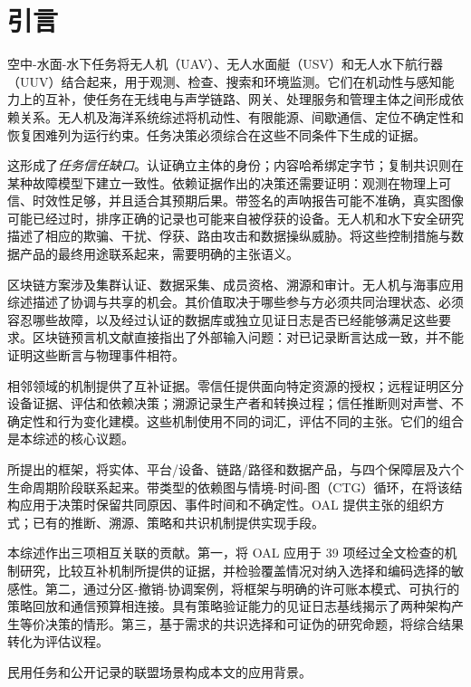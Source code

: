 \section{引言}

空中-水面-水下任务将无人机（UAV）、无人水面艇（USV）和无人水下航行器（UUV）结合起来，用于观测、检查、搜索和环境监测。它们在机动性与感知能力上的互补，使任务在无线电与声学链路、网关、处理服务和管理主体之间形成依赖关系\citep{li2023survey,wei20233u,pang2026cooperative}。无人机及海洋系统综述将机动性、有限能源、间歇通信、定位不确定性和恢复困难列为运行约束\citep{hayat2016survey,shakhatreh2019unmanned,bae2023survey,gonzlezgarca2020autonomous}。任务决策必须综合在这些不同条件下生成的证据。

这形成了\emph{任务信任缺口}。认证确立主体的身份；内容哈希绑定字节；复制共识则在某种故障模型下建立一致性。依赖证据作出的决策还需要证明：观测在物理上可信、时效性足够，并且适合其预期后果。带签名的声呐报告可能不准确，真实图像可能已经过时，排序正确的记录也可能来自被俘获的设备。无人机和水下安全研究描述了相应的欺骗、干扰、俘获、路由攻击和数据操纵威胁\citep{mekdad2023survey,wang2025survey,hadi2023comprehensive,jiang2019securing,yisa2021security}。将这些控制措施与数据产品的最终用途联系起来，需要明确的主张语义。

区块链方案涉及集群认证、数据采集、成员资格、溯源和审计\citep{han2022identity,tan2022blockchain,karmakar2024blockchain,islam2019bus}。无人机与海事应用综述描述了协调与共享的机会\citep{hafeez2023blockchain,alladi2020applications,mehta2020blockchain,farah2024survey,li2021survey}。其价值取决于哪些参与方必须共同治理状态、必须容忍哪些故障，以及经过认证的数据库或独立见证日志是否已经能够满足这些要求。区块链预言机文献直接指出了外部输入问题：对已记录断言达成一致，并不能证明这些断言与物理事件相符\citep{caldarelli2020oracle,albreiki2020oracles}。

相邻领域的机制提供了互补证据。零信任提供面向特定资源的授权\citep{rose2020zero,syed2022zero}；远程证明区分设备证据、评估和依赖决策\citep{birkholz2023remote}；溯源记录生产者和转换过程\citep{w3c2013provdm,w3c2013provo}；信任推断则对声誉、不确定性和行为变化建模\citep{ahmed2019trust,aaqib2023iot,jsang2016subjective}。这些机制使用不同的词汇，评估不同的主张。它们的组合是本综述的核心议题。

所提出的\OAL{}框架，将实体、平台/设备、链路/路径和数据产品，与四个保障层及六个生命周期阶段联系起来。带类型的依赖图与情境-时间-图（CTG）循环，在将该结构应用于决策时保留共同原因、事件时间和不确定性。OAL 提供主张的组织方式；已有的推断、溯源、策略和共识机制提供实现手段。

本综述作出三项相互关联的贡献。第一，将 OAL 应用于 39 项经过全文检查的机制研究，比较互补机制所提供的证据，并检验覆盖情况对纳入选择和编码选择的敏感性。第二，通过分区-撤销-协调案例，将框架与明确的许可账本模式、可执行的策略回放和通信预算相连接。具有策略验证能力的见证日志基线揭示了两种架构产生等价决策的情形。第三，基于需求的共识选择和可证伪的研究命题，将综合结果转化为评估议程。

民用任务和公开记录的联盟场景构成本文的应用背景。
